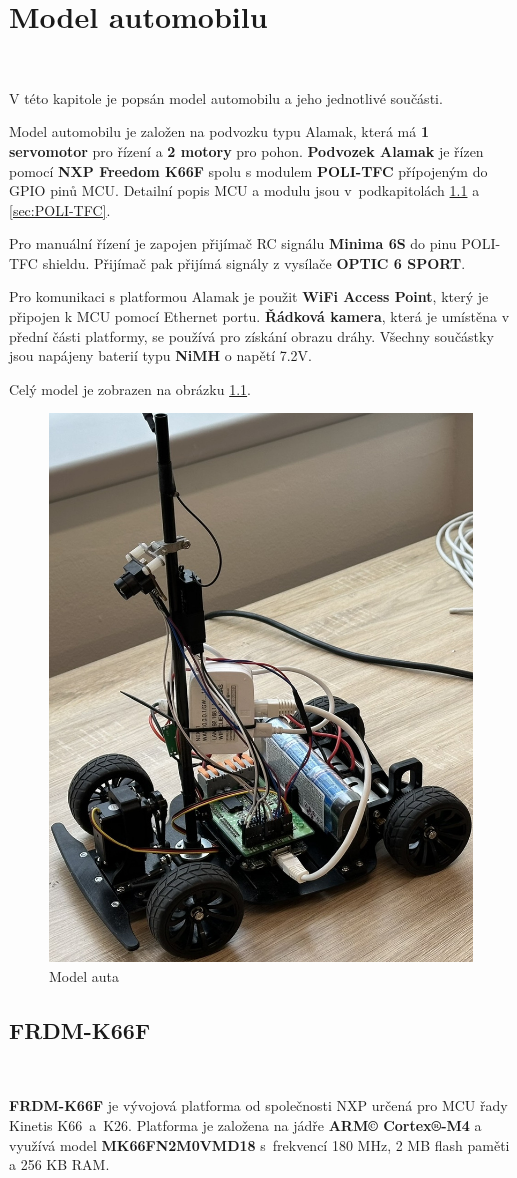 \chapter{Model automobilu}
\label{sec:CarModel}
\

V této kapitole je popsán model automobilu a jeho jednotlivé součásti.

Model automobilu je založen na podvozku typu Alamak, která má \textbf{1 servomotor}
pro řízení a \textbf{2 motory} pro pohon.
\textbf{Podvozek Alamak} je řízen pomocí \textbf{NXP Freedom K66F}\cite{frdmk66UserGuide} spolu s modulem \textbf{POLI-TFC} přípojeným do GPIO pinů
MCU. Detailní popis MCU a modulu jsou v~podkapitolách \ref{sec:FRDM-K66F}
a \ref{sec:POLI-TFC}.

Pro manuální řízení je zapojen přijímač RC signálu \textbf{Minima 6S} do pinu
POLI-TFC shieldu. Přijímač pak přijímá signály z vysílače \textbf{OPTIC 6 SPORT}.

Pro komunikaci s platformou Alamak je použit \textbf{WiFi Access Point}, který je
připojen k MCU pomocí Ethernet portu. \textbf{Řádková kamera}, která je umístěna
v přední části platformy, se používá pro získání obrazu dráhy. Všechny součástky
jsou napájeny baterií typu \textbf{NiMH} o napětí 7.2V.

Celý model je zobrazen na obrázku \ref{fig:car}.
\begin{figure}[!h]
    \centering
    \includegraphics[width = .4\linewidth]{Figures/Car.jpeg}
    \caption{Model auta}
    \label{fig:car}
\end{figure}

\section{FRDM-K66F}
\label{sec:FRDM-K66F}\

\textbf{FRDM-K66F} je vývojová platforma od společnosti NXP určená pro MCU řady Kinetis
K66~a~K26. Platforma je založena na jádře \textbf{ARM© Cortex®-M4} a využívá model
\textbf{MK66FN2M0VMD18} s~frekvencí 180 MHz, 2 MB flash paměti a 256 KB RAM.

